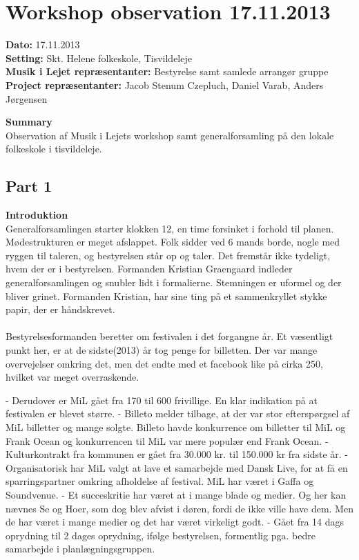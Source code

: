 \section{Workshop observation 17.11.2013}
\label{workshop}

\textbf{Dato:} 17.11.2013 \\
\textbf{Setting:} Skt. Helene folkeskole, Tisvildeleje \\
\textbf{Musik i Lejet repræsentanter:} Bestyrelse samt samlede arrangør gruppe \\
\textbf{Project repræsentanter:} Jacob Stenum Czepluch, Daniel Varab, Anders Jørgensen

\bigskip

\noindent \textbf{Summary} \\
Observation af Musik i Lejets workshop samt generalforsamling på den lokale folkeskole i tisvildeleje.

\subsection{Part 1}
\label{ws1}
\noindent \textbf{Introduktion} \\
Generalforsamlingen starter klokken 12, en time forsinket i forhold til planen. Mødestrukturen er meget afslappet. Folk sidder ved 6 mands borde, nogle med ryggen til taleren, og bestyrelsen står op og taler. Det fremstår ikke tydeligt, hvem der er i bestyrelsen. Formanden Kristian Graengaard indleder generalforsamlingen og snubler lidt i formalierne. Stemningen er uformel og der bliver grinet. Formanden Kristian, har sine ting på et sammenkryllet stykke papir, der er håndskrevet.
\\ \\
Bestyrelsesformanden beretter om festivalen i det forgangne år. Et væsentligt punkt her, er at de sidste(2013) år tog penge for billetten. Der var mange overvejelser omkring det, men det endte med et facebook like på cirka 250, hvilket var meget overraskende.


- Derudover er MiL gået fra 170 til 600 frivillige. En klar indikation på at festivalen er blevet større. 
- Billeto melder tilbage, at der var stor efterspørgsel af MiL billetter og mange solgte. Billeto havde konkurrence om billetter til MiL og Frank Ocean og konkurrencen til MiL var mere populær end Frank Ocean. 
- Kulturkontrakt fra kommunen er gået fra 30.000 kr. til 150.000 kr fra sidste år.
- Organisatorisk har MiL valgt at lave et samarbejde med Dansk Live, for at få en sparringspartner omkring afholdelse af festival. MiL har været i Gaffa og Soundvenue.
- Et succeskritie har været at i mange blade og medier. Og her kan nævnes Se og Hoer, som dog blev afvist i døren, fordi de ikke ville have dem. Men de har været i mange medier og det har været virkeligt godt.
- Gået fra 14 dags oprydning til 2 dages oprydning, ifølge bestyrelsen, formentlig pga. bedre samarbejde i planlægningsgruppen.


